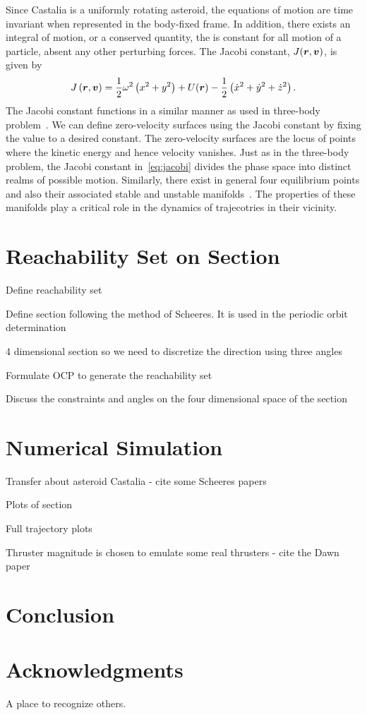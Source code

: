 \documentclass[]{aiaa-tc}%
\begin{document}
Since Castalia is a uniformly rotating asteroid, the equations of motion are time invariant when represented in the body-fixed frame.
In addition, there exists an integral of motion, or a conserved quantity, the is constant for all motion of a particle, absent any other perturbing forces.
The Jacobi constant, \( J (\bm{r} , \bm{v} ) \), is given by
\begin{align}\label{eq:jacobi}
	J \left( \bm{r}, \bm{v} \right) = \frac{1}{2} \omega^2 \left( x^2 + y^2 \right) + U(\bm{r}) - \frac{1}{2} \left( \dot{x}^2 + \dot{y}^2 + \dot{z}^2 \right) .
\end{align}
The Jacobi constant functions in a similar manner as used in three-body problem~\cite{szebehely1967}.
We can define zero-velocity surfaces using the Jacobi constant by fixing the value to a desired constant.
The zero-velocity surfaces are the locus of points where the kinetic energy and hence velocity vanishes.
Just as in the three-body problem, the Jacobi constant in~\cref{eq:jacobi} divides the phase space into distinct realms of possible motion.
Similarly, there exist in general four equilibrium points and also their associated stable and unstable manifolds~\cite{scheeres1996,scheeres1994}.
The properties of these manifolds play a critical role in the dynamics of trajecotries in their vicinity.

\section{Reachability Set on \Poincare Section}


Define reachability set

Define \Poincare section following the method of Scheeres.
It is used in the periodic orbit determination~\cite{}

4 dimensional \Poincare section so we need to discretize the direction using three angles

Formulate OCP to generate the reachability set

Discuss the constraints and angles on the four dimensional space of the section

\section{Numerical Simulation}

Transfer about asteroid Castalia - cite some Scheeres papers

Plots of \Poincare section

Full trajectory plots

Thruster magnitude is chosen to emulate some real thrusters - cite the Dawn paper

\section{Conclusion}


\section*{Acknowledgments}

A place to recognize others.



\end{document}
